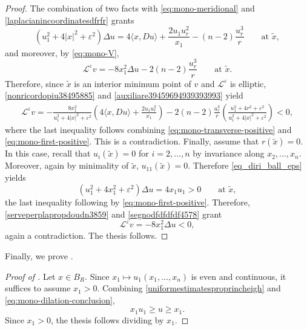 \documentclass[11pt]{amsart}
\renewcommand{\geq}{\geqslant}
\renewcommand{\ge}{>}
\newcommand{\eps}{\varepsilon}
\newcommand{\Le}{\mathcal L^\eps}
\theoremstyle{definition}
\theoremstyle{remark}
\numberwithin{equation}{section}
\begin{document}
\begin{proof}
The combination of two facts with \eqref{eq:mono-meridional} and \eqref{laplacianincoordinatesdfrfr} grants 
\begin{equation}\label{nonricordopiu38495885}
 (u_1^2+4|x|^2+\varepsilon^2)\Delta u
 =4\langle x,Du\rangle+\frac{2u_1u_r^2}{x_1}-(n-2)\frac{u_r^3}{r} \qquad\text{at }\tilde x,
\end{equation}
and moreover, by \eqref{eq:mono-V},
\begin{equation}\label{auxiliare39459694939393993}
    \Le v=-8x_1^2\Delta u-2(n-2)\frac{u_r^3}{r}\qquad \text{at }\tilde x.
\end{equation}
Therefore, since $\tilde x$ is an interior minimum point of $v$ and $\Le$ is elliptic, \eqref{nonricordopiu38495885} and \eqref{auxiliare39459694939393993} yield
\begin{equation}
 \begin{split}
 \Le v=-
 \frac{8x_1^2}{u_1^2+4|x|^2+\varepsilon^2}
 \left(4\langle x,Du\rangle+\frac{2u_1u_r^2}{x_1}\right)-2(n-2)\frac{u_r^3}{r}
 \left(\frac{u_1^2+4r^2+\eps^2}{u_1^2+4|x|^2+\varepsilon^2}\right)<0,
 \end{split}
\end{equation}
where the last inequality follows combining \eqref{eq:mono-transverse-positive} and \eqref{eq:mono-first-positive}. This is a contradiction.
Finally, assume that $r(\tilde x)=0$.
 In this case, recall that $u_i(\tilde x)=0$ for $i=2,\ldots,n$ by invariance along $x_2,\ldots,x_n$. Moreover, again by minimality of $\tilde x$, $u_{11}(\tilde x)=0$. Therefore \eqref{eq_diri_ball_eps} yields 
\begin{equation}\label{segnodfdfdfdf4578}
 (u_1^2+4x_1^2+\varepsilon^2)\Delta u=4x_1u_1\ge 0\qquad \text{at }\tilde x,
\end{equation}
the last inequality following by \eqref{eq:mono-first-positive}. 
Therefore, \eqref{serveperplapropdoudn3859} and \eqref{segnodfdfdfdf4578} grant  
$$\Le v=-8x_1^2\Delta u<0,$$
again a contradiction. The thesis follows.
\end{proof}
Finally, we prove .
\begin{proof}[Proof of ]
   Let $x\in B_R$. Since $x_1\mapsto u_1(x_1,\ldots,x_n)$ is even and continuous, it suffices to assume $x_1\ge 0$.  Combining \eqref{uniformestimatesproprincheigh} and \eqref{eq:mono-dilation-conclusion},
   \begin{equation*}
       x_1 u_1\geq u\geq x_1.
   \end{equation*}
   Since $x_1\ge 0$, the thesis follows dividing by $x_1$.
\end{proof}
\end{document}
